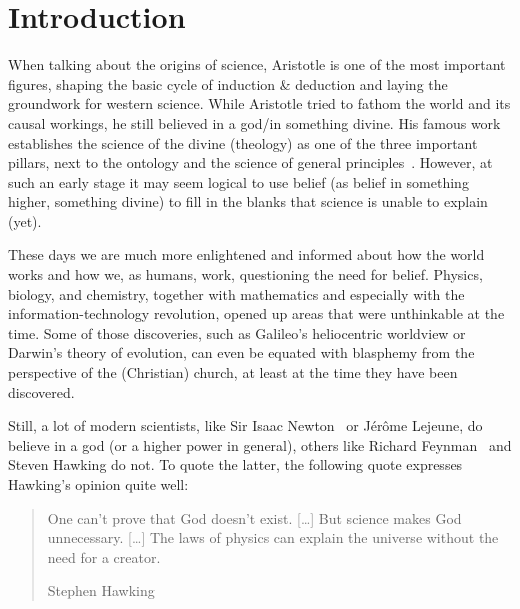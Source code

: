 \section{Introduction}

When talking about the origins of science, Aristotle is one of the most important figures, shaping the basic cycle of induction \& deduction and laying the groundwork for western science.
While Aristotle tried to fathom the world and its causal workings, he still believed in a god/in something divine.
His famous work  establishes the science of the divine (theology) as one of the three important pillars, next to the ontology and the science of general principles~\cite{aristotle350}.
However, at such an early stage it may seem logical to use belief  (as belief in something higher, something divine) to fill in the blanks that science is unable to explain (yet).

These days we are much more enlightened and informed about how the world works and how we, as humans, work, questioning the need for belief.
Physics, biology, and chemistry, together with mathematics and especially with the information-technology revolution, opened up areas that were unthinkable at the time.
Some of those discoveries, such as Galileo's heliocentric worldview or Darwin's theory of evolution, can even be equated with blasphemy from the perspective of the (Christian) church, at least at the time they have been discovered.

Still, a lot of modern scientists, like Sir Isaac Newton~\cite[p. 315]{westfall1983} or Jérôme Lejeune, do believe in a god (or a higher power in general), others like Richard Feynman~\cite{feynman2001,brian2001} and Steven Hawking do not.
To quote the latter, the following quote expresses Hawking's opinion quite well:
\blockquote[Stephen Hawking]{One can't prove that God doesn't exist. \textcolor{gray}{[\ldots]} But science makes God unnecessary. \textcolor{gray}{[\ldots]} The laws of physics can explain the universe without the need for a creator.}

